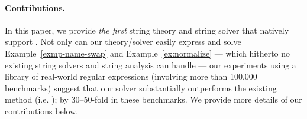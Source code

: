 {%
}



\paragraph*{Contributions.}
In this paper, we provide \emph{the first} string theory and string solver that
natively support \regexp{}. Not only can our theory/solver easily express and 
solve Example~\ref{exmp-name-swap} and Example~\ref{ex:normalize} --- which hitherto no 
existing string solvers and string analysis can handle --- our experiments
using a library of real-world regular expressions (involving more than 100,000
benchmarks) suggest that our solver substantially outperforms the existing 
method (i.e.  \cite{LMK19}); by 30--50-fold in these benchmarks. 
We provide more details of our contributions below.

